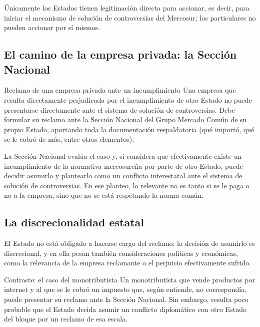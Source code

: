 \documentclass[12pt,oneside]{book}
\begin{document}
Únicamente los Estados tienen legitimación directa para accionar, es decir, para iniciar el mecanismo de solución de controversias del Mercosur; los particulares no pueden accionar por sí mismos.

\subsection{El camino de la empresa privada: la Sección Nacional}

\begin{example}{Reclamo de una empresa privada ante un incumplimiento}
Una empresa que resulta directamente perjudicada por el incumplimiento de otro Estado no puede presentarse directamente ante el sistema de solución de controversias. Debe formular su reclamo ante la Sección Nacional del Grupo Mercado Común de su propio Estado, aportando toda la documentación respaldatoria (qué importó, qué se le cobró de más, entre otros elementos).
\end{example}

La Sección Nacional evalúa el caso y, si considera que efectivamente existe un incumplimiento de la normativa mercosureña por parte de otro Estado, puede decidir asumirlo y plantearlo como un conflicto interestatal ante el sistema de solución de controversias. En ese planteo, lo relevante no es tanto si se le paga o no a la empresa, sino que no se está respetando la norma común.

\subsection{La discrecionalidad estatal}

El Estado no está obligado a hacerse cargo del reclamo: la decisión de asumirlo es discrecional, y en ella pesan también consideraciones políticas y económicas, como la relevancia de la empresa reclamante o el perjuicio efectivamente sufrido.

\begin{example}{Contraste: el caso del monotributista}
Un monotributista que vende productos por internet y al que se le cobró un impuesto que, según entiende, no correspondía, puede presentar su reclamo ante la Sección Nacional. Sin embargo, resulta poco probable que el Estado decida asumir un conflicto diplomático con otro Estado del bloque por un reclamo de esa escala.
\end{example}

\end{document}
